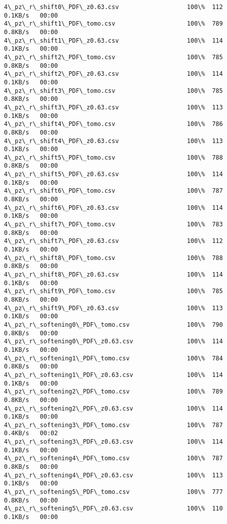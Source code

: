 \documentclass[11pt]{article}
\begin{document}
\begin{Verbatim}[commandchars=\\\{\}]
4\_pz\_r\_shift0\_PDF\_z0.63.csv                   100\%  112     0.1KB/s   00:00    
4\_pz\_r\_shift1\_PDF\_tomo.csv                    100\%  789     0.8KB/s   00:00    
4\_pz\_r\_shift1\_PDF\_z0.63.csv                   100\%  114     0.1KB/s   00:00    
4\_pz\_r\_shift2\_PDF\_tomo.csv                    100\%  785     0.8KB/s   00:00    
4\_pz\_r\_shift2\_PDF\_z0.63.csv                   100\%  114     0.1KB/s   00:00    
4\_pz\_r\_shift3\_PDF\_tomo.csv                    100\%  785     0.8KB/s   00:00    
4\_pz\_r\_shift3\_PDF\_z0.63.csv                   100\%  113     0.1KB/s   00:00    
4\_pz\_r\_shift4\_PDF\_tomo.csv                    100\%  786     0.8KB/s   00:00    
4\_pz\_r\_shift4\_PDF\_z0.63.csv                   100\%  113     0.1KB/s   00:00    
4\_pz\_r\_shift5\_PDF\_tomo.csv                    100\%  788     0.8KB/s   00:00    
4\_pz\_r\_shift5\_PDF\_z0.63.csv                   100\%  114     0.1KB/s   00:00    
4\_pz\_r\_shift6\_PDF\_tomo.csv                    100\%  787     0.8KB/s   00:00    
4\_pz\_r\_shift6\_PDF\_z0.63.csv                   100\%  114     0.1KB/s   00:00    
4\_pz\_r\_shift7\_PDF\_tomo.csv                    100\%  783     0.8KB/s   00:00    
4\_pz\_r\_shift7\_PDF\_z0.63.csv                   100\%  112     0.1KB/s   00:00    
4\_pz\_r\_shift8\_PDF\_tomo.csv                    100\%  788     0.8KB/s   00:00    
4\_pz\_r\_shift8\_PDF\_z0.63.csv                   100\%  114     0.1KB/s   00:00    
4\_pz\_r\_shift9\_PDF\_tomo.csv                    100\%  785     0.8KB/s   00:00    
4\_pz\_r\_shift9\_PDF\_z0.63.csv                   100\%  113     0.1KB/s   00:00    
4\_pz\_r\_softening0\_PDF\_tomo.csv                100\%  790     0.8KB/s   00:00    
4\_pz\_r\_softening0\_PDF\_z0.63.csv               100\%  114     0.1KB/s   00:00    
4\_pz\_r\_softening1\_PDF\_tomo.csv                100\%  784     0.8KB/s   00:00    
4\_pz\_r\_softening1\_PDF\_z0.63.csv               100\%  114     0.1KB/s   00:00    
4\_pz\_r\_softening2\_PDF\_tomo.csv                100\%  789     0.8KB/s   00:00    
4\_pz\_r\_softening2\_PDF\_z0.63.csv               100\%  114     0.1KB/s   00:00    
4\_pz\_r\_softening3\_PDF\_tomo.csv                100\%  787     0.4KB/s   00:02    
4\_pz\_r\_softening3\_PDF\_z0.63.csv               100\%  114     0.1KB/s   00:00    
4\_pz\_r\_softening4\_PDF\_tomo.csv                100\%  787     0.8KB/s   00:00    
4\_pz\_r\_softening4\_PDF\_z0.63.csv               100\%  113     0.1KB/s   00:00    
4\_pz\_r\_softening5\_PDF\_tomo.csv                100\%  777     0.8KB/s   00:00    
4\_pz\_r\_softening5\_PDF\_z0.63.csv               100\%  110     0.1KB/s   00:00    

\end{Verbatim}
\end{document}
